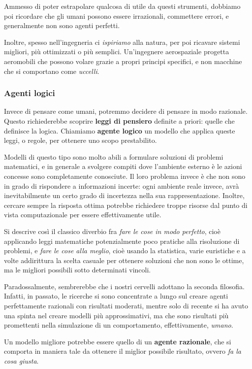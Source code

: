 \documentclass[a4paper,11pt]{article}
\begin{document}
Ammesso di poter estrapolare qualcosa di utile da questi strumenti, dobbiamo poi ricordare che gli umani possono essere irrazionali, commettere errori, e generalmente non sono agenti perfetti.

Inoltre, spesso nell'ingegneria ci \textit{ispiriamo} alla natura, per poi ricavare sistemi migliori, più ottimizzati o più semplici.
Un'ingegnere aerospaziale progetta aeromobili che possono volare grazie a propri principi specifici, e non macchine che si comportano come \textit{uccelli}.

\subsubsection{Agenti logici}
Invece di pensare come umani, potremmo decidere di pensare in modo razionale. 
Questo richiederebbe scoprire \textbf{leggi di pensiero} definite a priori: quelle che definisce la logica.
Chiamiamo \textbf{agente logico} un modello che applica queste leggi, o regole, per ottenere uno scopo prestabilito.

Modelli di questo tipo sono molto abili a formulare soluzioni di problemi matematici, e in generale a svolgere compiti dove l'ambiente esterno è le azioni concesse sono completamente conosciute.
Il loro problema invece è che non sono in grado di rispondere a informazioni incerte: ogni ambiente reale invece, avrà inevitabilmente un certo grado di incertezza nella sua rappresentazione.
Inoltre, cercare sempre la risposta ottima potrebbe richiedere troppe risorse dal punto di vista computazionale per essere effettivamente utile.

Si descrive così il classico diverbio fra \textit{fare le cose in modo perfetto}, cioè applicando leggi matematiche potenzialmente poco pratiche alla risoluzione di problemi, e \textit{fare le cose alla meglio}, cioè usando la statistica, varie euristiche e a volte addirittura la scelta casuale per ottenere soluzioni che non sono le ottime, ma le migliori possibili sotto determinati vincoli.

Paradossalmente, sembrerebbe che i nostri cervelli adottano la seconda filosofia.
Infatti, in passato, le ricerche si sono concentrate a lungo sul creare agenti perfettamente razionali con risultati moderati, mentre solo di recente si ha avuto una spinta nel creare modelli più approssimativi, ma che sono risultati più promettenti nella simulazione di un comportamento, effettivamente, \textit{umano}. 

Un modello migliore potrebbe essere quello di un \textbf{agente razionale}, che si comporta in maniera tale da ottenere il miglior possibile risultato, ovvero \textit{fa la cosa giusta}.
\end{document}
